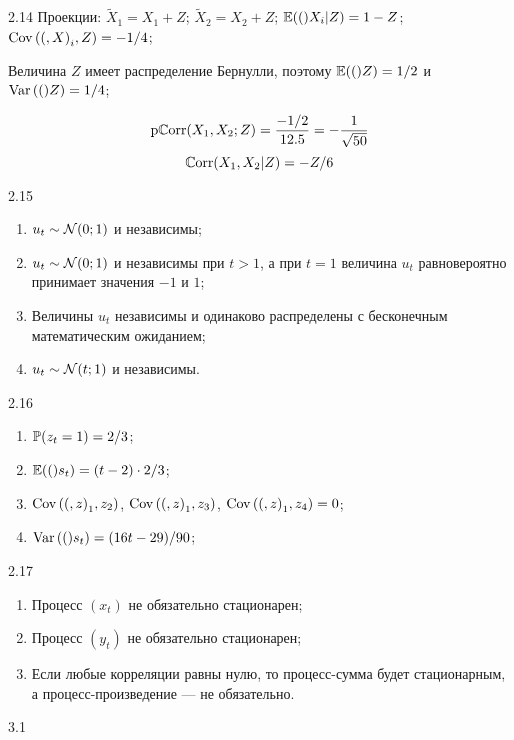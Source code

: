 \protect \hypertarget {soln:2.14}{}
\begin{solution}{{2.14}}
Проекции: $\tilde X_1 = X_1 + Z$; $\tilde X_2 = X_2 + Z$; $\E(X_i|Z)=1-Z$; $\Cov(X_i, Z)=-1/4$;

Величина $Z$ имеет распределение Бернулли, поэтому $\E(Z)=1/2$ и $\Var(Z)=1/4$;

\[
  \pCorr(X_1, X_2; Z) = \frac{-1/2}{12.5} = -\frac{1}{\sqrt{50}}
\]
\[
  \Corr(X_1, X_2|Z)=-Z/6
\]
  
\end{solution}
\protect \hypertarget {soln:2.15}{}
\begin{solution}{{2.15}}
\begin{enumerate}
  \item $u_t \sim \cN(0;1)$ и независимы;
  \item $u_t \sim \cN(0;1)$ и независимы при $t>1$, а при $t=1$ величина $u_t$ равновероятно
  принимает значения $-1$ и $1$;
  \item Величины $u_t$ независимы и одинаково распределены с бесконечным математическим ожиданием;
  \item $u_t \sim \cN(t;1)$ и независимы.
\end{enumerate}
\end{solution}
\protect \hypertarget {soln:2.16}{}
\begin{solution}{{2.16}}
  \begin{enumerate}
  \item $\P(z_t = 1) = 2/3$;
  \item $\E(s_t) = (t-2) \cdot 2/3$;
  \item $\Cov(z_1, z_2)$, $\Cov(z_1, z_3)$, $\Cov(z_1, z_4) = 0$;
  \item $\Var(s_t) = (16t - 29)/90$;
  \end{enumerate}

\end{solution}
\protect \hypertarget {soln:2.17}{}
\begin{solution}{{2.17}}
\begin{enumerate}
  \item Процесс $(x_t)$ не обязательно стационарен;
\item Процесс $(y_t)$ не обязательно стационарен;
\item Если любые корреляции равны нулю, то процесс-сумма будет стационарным, а процесс-произведение — не обязательно.
\end{enumerate}
\end{solution}
\protect \hypertarget {soln:3.1}{}
\begin{solution}{{3.1}}

\end{solution}
